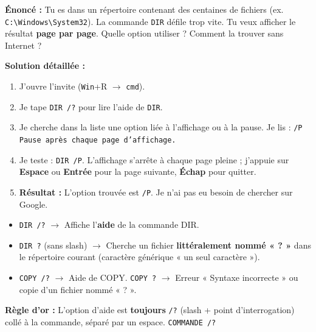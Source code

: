 \documentclass[11pt]{article}
\begin{document}
\begin{exoresolu}
\textbf{Énoncé :} Tu es dans un répertoire contenant des centaines de fichiers (ex. \texttt{C:\textbackslash Windows\textbackslash System32}). La commande \texttt{DIR} défile trop vite. Tu veux afficher le résultat \textbf{page par page}. Quelle option utiliser ? Comment la trouver sans Internet ?

\textbf{Solution détaillée :}
\begin{enumerate}
    \item J'ouvre l'invite (\texttt{Win}+R $\rightarrow$ \texttt{cmd}).
    \item Je tape \texttt{DIR /?} pour lire l'aide de \texttt{DIR}.
    \item Je cherche dans la liste une option liée à l'affichage ou à la pause. Je lis : \texttt{/P  Pause après chaque page d'affichage.}
    \item Je teste : \texttt{DIR /P}. L'affichage s'arrête à chaque page pleine ; j'appuie sur \textbf{Espace} ou \textbf{Entrée} pour la page suivante, \textbf{Échap} pour quitter.
    \item \textbf{Résultat :} L'option trouvée est \texttt{/P}. Je n'ai pas eu besoin de chercher sur Google.
\end{enumerate}
\end{exoresolu}

\begin{attention}
\begin{itemize}
    \item \texttt{DIR /?} $\rightarrow$ Affiche l'\textbf{aide} de la commande DIR.
    \item \texttt{DIR ?} (sans slash) $\rightarrow$ Cherche un fichier \textbf{littéralement nommé « ? »} dans le répertoire courant (caractère générique « un seul caractère »).
    \item \texttt{COPY /?} $\rightarrow$ Aide de COPY. \quad \texttt{COPY ?} $\rightarrow$ Erreur « Syntaxe incorrecte » ou copie d'un fichier nommé « ? ».
\end{itemize}
\textbf{Règle d'or :} L'option d'aide est \textbf{toujours} \texttt{/?} (slash + point d'interrogation) collé à la commande, séparé par un espace. \texttt{COMMANDE /?}
\end{attention}
\end{document}
